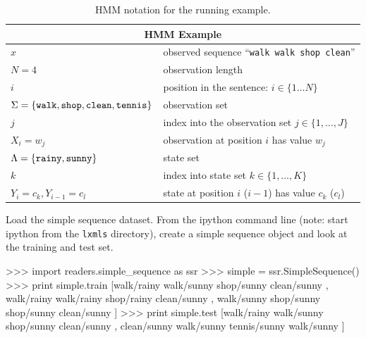 \begin{table}[h]
\begin{center}
\begin{tabular}{|l|l|}
\hline
\multicolumn{2}{|c|}{HMM Example}\\
\hline
\hline
$x$ & observed sequence ``{\tt walk walk shop clean}'' \\
\hline
$N = 4$ & observation length \\
\hline
$i$ & position in the sentence: $i \in \{1 \ldots N\}$ \\
\hline
$\Sigma = \{\text{{\tt walk}},\text{{\tt shop}},\text{{\tt clean}},\text{{\tt tennis}}\}$ & observation set \\
\hline 
$j$ & index into the observation set $j \in \{1,\ldots, J\}$\\
\hline
$X_i = w_j$ & observation at position $i$ 
has value $w_j$\\
\hline 
$\Lambda = \{\text{{\tt rainy}},\text{{\tt sunny}}\}$ & state set\\
\hline 
$k$ & index into state set $k \in \{1,\ldots,K\}$\\
\hline
$Y_i = c_k, Y_{i-1}=c_l$ & state at position $i$ ($i-1$) has value $c_k$ ($c_l$)\\
\hline
\end{tabular}
\end{center}
\caption[HMM notation]{\label{tab:hmm-simple-notation} HMM notation for the running example.}
\end{table}



\begin{exercise}
Load the simple sequence dataset. 
From the ipython command line (note: start ipython from the {\tt lxmls}
directory), create a simple sequence object and look at the training
and test set.
\begin{python}
>>> import readers.simple_sequence as ssr
>>> simple = ssr.SimpleSequence()
>>> print simple.train
[walk/rainy walk/sunny shop/sunny clean/sunny , walk/rainy walk/rainy shop/rainy clean/sunny , walk/sunny shop/sunny shop/sunny clean/sunny ]
>>> print simple.test
[walk/rainy walk/sunny shop/sunny clean/sunny , clean/sunny walk/sunny tennis/sunny walk/sunny ]
\end{python}
\end{exercise}



